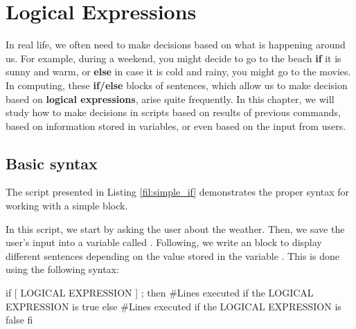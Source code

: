 \chapter{Logical Expressions}\label{ch:logical_expressions}

In real life, we often need to make decisions based on what is happening around us. For example, during a weekend, you might decide to go to the beach \textbf{if} it is sunny and warm, or \textbf{else} in case it is cold and rainy, you might go to the movies. In computing, these \textbf{if/else} blocks of sentences, which allow us to make decision based on \textbf{logical expressions}, arise quite frequently. In this chapter, we will study how to make decisions in  scripts based on results of previous commands, based on information stored in variables, or even based on the input from users. 

\section{Basic  syntax}

The script presented in Listing \ref{fil:simple_if} demonstrates the proper syntax for working with a simple  block.
 

In this script, we start by asking the user about the weather. Then, we save the user's input into a variable called . Following, we write an  block to display different sentences depending on the value stored in the variable . This is done using the following syntax:

\begin{command_line}[Bash]
if [ LOGICAL EXPRESSION ] ; then
    #Lines executed if the LOGICAL EXPRESSION is true
else
    #Lines executed if the LOGICAL EXPRESSION is false
fi
\end{command_line}

